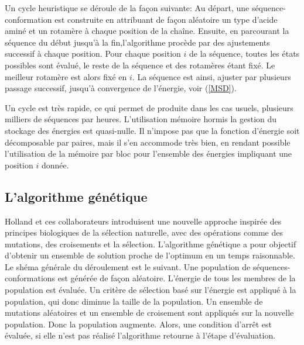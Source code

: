 Un cycle heuristique se déroule de la façon suivante:
Au départ, une séquence-conformation est construite en attribuant de façon aléatoire un type d'acide aminé et un rotamère à chaque position de la chaîne. Ensuite, en parcourant la séquence du début jusqu'à la fin,l'algorithme procède par des ajustements successif à chaque position. Pour chaque position $i$ de la séquence, toutes les états possibles sont évalué, le reste de la séquence et des rotamères étant fixé. Le meilleur rotamère est alors fixé en $i$. La séquence est ainsi, ajuster par plusieurs passage successif, jusqu'à convergence de l'énergie, voir (\ref{MSD}).

Un cycle est très rapide, ce qui permet de produite dans les cas usuels, plusieurs milliers de séquences par heures. L'utilisation mémoire hormis la gestion du stockage des énergies est quasi-nulle. Il n'impose pas que la fonction d'énergie soit décomposable par paires, mais il s'en accommode très bien, en rendant possible l'utilisation de la mémoire par bloc pour l'ensemble des énergies impliquant une position $i$ donnée.

\begin{algorithm}
  \label{alg:MSD}
\end{algorithm}


\subsection{L'algorithme  génétique}


Holland et ces collaborateurs introduisent une nouvelle approche inspirée des principes biologiques de la sélection naturelle, avec des opérations comme des mutations, des croisements et la sélection. L'algorithme génétique a pour objectif d'obtenir un ensemble de solution proche de l'optimum en un temps raisonnable. Le shéma générale du déroulement est le suivant. Une population de séquences-conformations est générée de façon aléatoire. L'énergie de tous les membres de la population est évaluée. Un critère de sélection basé sur l'énergie est appliqué à la population, qui donc diminue la taille de la population. Un ensemble de mutations aléatoires et un ensemble de croisement sont appliqués sur la nouvelle population. Donc la population augmente. Alors, une condition d'arrêt est évaluée, si elle n'est pas réalisé l'algorithme retourne à l'étape d'évaluation.


